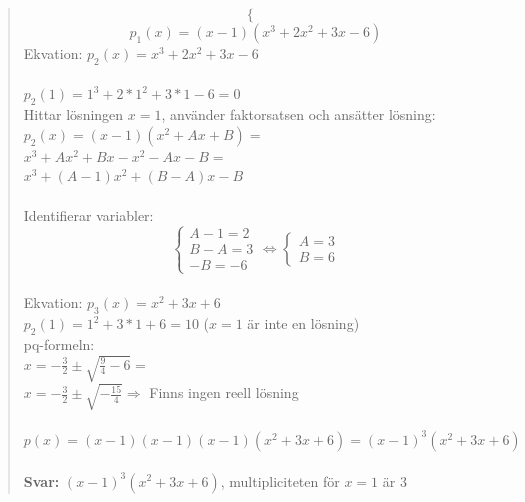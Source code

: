 \documentclass[a4paper]{article}
\begin{document}
\begin{quotation}
\[\begin{cases}
		\end{cases}\]
		\[p_1(x)=(x-1)(x^3+2x^2+3x-6)\]
		Ekvation: $p_2(x)=x^3+2x^2+3x-6$ \\ \\
		$p_2(1)=1^3+2*1^2+3*1-6=0$ \\
		Hittar lösningen $x=1$, använder faktorsatsen och ansätter lösning: \\
		$p_2(x)=(x-1)(x^2+Ax+B)=$ \\
		$x^3+Ax^2+Bx-x^2-Ax-B=$ \\
		$x^3+(A-1)x^2+(B-A)x-B$ \\ \\
		Identifierar variabler: \\
		\[\begin{cases} 
		A-1=2 \\ 
		B-A=3 \\ 
		-B=-6 
		\end{cases}
		\Leftrightarrow
		\begin{cases} 
		A=3 \\ 
		B=6
		\end{cases}\]
		\\
		Ekvation: $p_3(x)=x^2+3x+6$ \\
		$p_2(1)=1^2+3*1+6=10$ ($x=1$ är inte en lösning) \\
		pq-formeln: \\
		$x=-\frac{3}{2}\pm\sqrt{\frac{9}{4}-6}=$ \\
		$x=-\frac{3}{2}\pm\sqrt{-\frac{15}{4}} \Rightarrow$ Finns ingen reell lösning \\ \\
		$p(x)=(x-1)(x-1)(x-1)(x^2+3x+6)=(x-1)^3(x^2+3x+6)$ 
		\\ \\
		\textbf{Svar:} $(x-1)^3(x^2+3x+6)$, multipliciteten för $x=1$ är 3
	\end{quotation}
	
\end{document}
